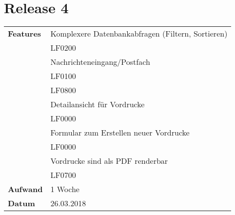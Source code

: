 \section*{Release 4}
\label{sec:release_4}

\begin{tabular}{p{5cm} p{9cm}}
    \textbf{Features} & Komplexere Datenbankabfragen (Filtern, Sortieren) \\
    & \hspace{8pt} LF0200 \\
    & Nachrichteneingang/Postfach \\
    & \hspace{8pt} LF0100 \\
    & \hspace{8pt} LF0800 \\
    & Detailansicht für Vordrucke \\
    & \hspace{8pt} LF0000 \\
    & Formular zum Erstellen neuer Vordrucke \\
    & \hspace{8pt} LF0000 \\
    & Vordrucke sind als PDF renderbar \\
    & \hspace{8pt} LF0700 \\
    \hline
    \textbf{Aufwand} & 1 Woche \\
    \hline
    \textbf{Datum} & 26.03.2018
\end{tabular}
